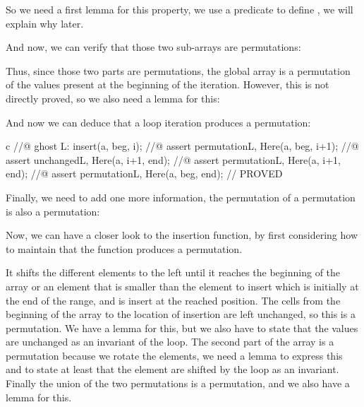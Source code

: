 So we need a first lemma for this property, we use a predicate
 to define , we will explain why
later.


And now, we can verify that those two sub-arrays are permutations:




Thus, since those two parts are permutations, the global array is a permutation
of the values present at the beginning of the iteration. However, this is not
directly proved, so we also need a lemma for this:





And now we can deduce that a loop iteration produces a permutation:



\begin{CodeBlock}{c}
    //@ ghost L:
    insert(a, beg, i);
    //@ assert permutation{L, Here}(a, beg, i+1);
    //@ assert unchanged{L, Here}(a, i+1, end);
    //@ assert permutation{L, Here}(a, i+1, end);
    //@ assert permutation{L, Here}(a, beg, end); // PROVED
\end{CodeBlock}



Finally, we need to add one more information, the permutation of a permutation
is also a permutation:






Now, we can have a closer look to the insertion function, by first considering
how to maintain that the function produces a permutation.




It shifts the different elements to the left until it reaches the beginning of
the array or an element that is smaller than the element to insert which is
initially at the end of the range, and is insert at the reached position. The
cells from the beginning of the array to the location of insertion are left
unchanged, so this is a permutation. We have a lemma for this, but we also have
to state that the values are unchanged as an invariant of the loop. The second
part of the array is a permutation because we rotate the elements, we need a
lemma to express this and to state at least that the element are shifted by the
loop as an invariant. Finally the union of the two permutations is a permutation,
and we also have a lemma for this.



